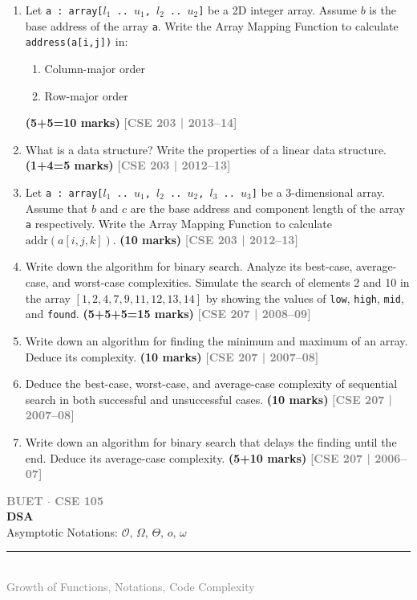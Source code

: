 \documentclass[12pt,a3paper]{article}
\newcommand{\yr}[1]{\hfill\textcolor{gray}{\small\textbf{[#1]}}}
\newcommand{\mk}[1]{\textcolor{orange!70!black}{\small\textbf{(#1 marks)}}}
\newcommand{\secdivider}[4]{%
  \newpage\thispagestyle{empty}%
  \vspace*{\fill}%
  \begin{tcolorbox}[enhanced,colback=#4!7,colframe=#3,boxrule=1.5pt,arc=8pt,
    left=20pt,right=20pt,top=22pt,bottom=22pt,
    shadow={3pt}{-3pt}{0pt}{black!15}]
    \centering
    {\large\textcolor{gray}{\textbf{BUET $\cdot$ CSE 105}}}\\[8pt]
    {\fontsize{26}{32}\selectfont\bfseries\textcolor{#3}{DSA}}\\[6pt]
    {\fontsize{15}{19}\selectfont\textcolor{dgray}{#1}}\\[12pt]
    \textcolor{#3!60}{\rule{0.5\textwidth}{0.5pt}}\\[6pt]
    {\small\textcolor{gray}{#2}}
  \end{tcolorbox}%
  \vspace*{\fill}\newpage%
}
\begin{document}
\begin{enumerate}
\item Let \texttt{a : array[$l_1$\,..\,$u_1$, $l_2$\,..\,$u_2$]} be a 2D integer array. Assume $b$ is the base address of the array \texttt{a}. Write the Array Mapping Function to calculate \texttt{address(a[i,j])} in:
\begin{enumerate}
  \item Column-major order
  \item Row-major order
\end{enumerate}
\mk{5+5=10}
\yr{CSE 203 | 2013--14}

\item What is a data structure? Write the properties of a linear data structure. \mk{1+4=5}
\yr{CSE 203 | 2012--13}

\item Let \texttt{a : array[$l_1$\,..\,$u_1$, $l_2$\,..\,$u_2$, $l_3$\,..\,$u_3$]} be a 3-dimensional array. Assume that $b$ and $c$ are the base address and component length of the array \texttt{a} respectively. Write the Array Mapping Function to calculate $\text{addr}(a[i, j, k])$. \mk{10}
\yr{CSE 203 | 2012--13}

\item Write down the algorithm for binary search. Analyze its best-case, average-case, and worst-case complexities. Simulate the search of elements 2 and 10 in the array $[1, 2, 4, 7, 9, 11, 12, 13, 14]$ by showing the values of \texttt{low}, \texttt{high}, \texttt{mid}, and \texttt{found}. \mk{5+5+5=15}
\yr{CSE 207 | 2008--09}

\item Write down an algorithm for finding the minimum and maximum of an array. Deduce its complexity. \mk{10}
\yr{CSE 207 | 2007--08}

\item Deduce the best-case, worst-case, and average-case complexity of sequential search in both successful and unsuccessful cases. \mk{10}
\yr{CSE 207 | 2007--08}

\item Write down an algorithm for binary search that delays the finding until the end. Deduce its average-case complexity. \mk{5+10}
\yr{CSE 207 | 2006--07}

\end{enumerate}
\newpage

\secdivider{Asymptotic Notations: $\mathcal{O},\,\Omega,\,\Theta,\,o,\,\omega$}{Growth of Functions, Notations, Code Complexity}{cB}{cB}
\label{sec:T2}
\end{document}
